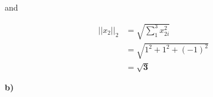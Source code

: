 \documentclass[12pt]{article}
\begin{document}
\noindent and


\begin{align*}
    ||x_2||_2 &= \sqrt{\sum_{1}^{3} x_{2i}^2} \\
              &= \sqrt{1^2 + 1^2 + (- 1)^2} \\
              &= \bm{\sqrt{3}}
\end{align*}


\noindent\textbf{b)} \newline


 
\end{document}
